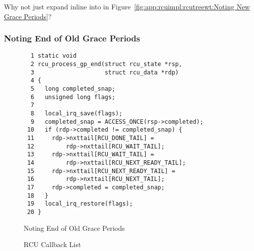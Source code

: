 \QuickQuiz{}
	Why not just expand  inline into
	 in
	Figure~\ref{fig:app:rcuimpl:rcutreewt:Noting New Grace Periods}?
 \QuickQuizEnd

\subsubsection{Noting End of Old Grace Periods}
\label{app:rcuimpl:rcutreewt:Noting End of Old Grace Periods}

\begin{figure}[tbp]
{ \scriptsize
\begin{verbatim}
  1 static void
  2 rcu_process_gp_end(struct rcu_state *rsp,
  3                    struct rcu_data *rdp)
  4 {
  5   long completed_snap;
  6   unsigned long flags;
  7
  8   local_irq_save(flags);
  9   completed_snap = ACCESS_ONCE(rsp->completed);
 10   if (rdp->completed != completed_snap) {
 11     rdp->nxttail[RCU_DONE_TAIL] =
 12         rdp->nxttail[RCU_WAIT_TAIL];
 13     rdp->nxttail[RCU_WAIT_TAIL] =
 14         rdp->nxttail[RCU_NEXT_READY_TAIL];
 15     rdp->nxttail[RCU_NEXT_READY_TAIL] =
 16         rdp->nxttail[RCU_NEXT_TAIL];
 17     rdp->completed = completed_snap;
 18   }
 19   local_irq_restore(flags);
 20 }
\end{verbatim}
}
\caption{Noting End of Old Grace Periods}
\label{fig:app:rcuimpl:rcutreewt:Noting End of Old Grace Periods}
\end{figure}

\begin{figure}[tb]
\centering
{}
\caption{RCU Callback List}
\label{fig:app:rcuimpl:rcutree:RCU Callback List}
\end{figure}

